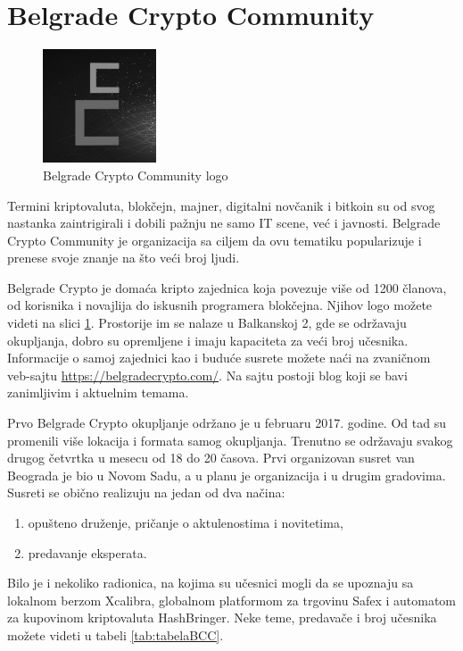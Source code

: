 \documentclass[a4paper]{article}
\begin{document}
{\section{Belgrade Crypto Community}
\label{sec:bgdcs}

\begin{figure}[H]
  \centering
  \includegraphics[width=0.3\textwidth]{bcc_logo.png}
  \caption{Belgrade Crypto Community logo}
  \label{fig:bgdcclogo}
\end{figure}

Termini  kriptovaluta, blokčejn, majner, digitalni novčanik i bitkoin su od svog nastanka zaintrigirali i dobili pažnju ne samo IT scene, već i javnosti. Belgrade Crypto Community je organizacija sa ciljem da ovu tematiku popularizuje i prenese svoje znanje na što veći broj ljudi.

Belgrade Crypto je domaća kripto zajednica koja povezuje više od 1200 članova, od korisnika i novajlija do iskusnih programera blokčejna. Njihov logo možete videti na slici \ref{fig:bgdcclogo}. Prostorije im se nalaze u Balkanskoj 2, gde se održavaju okupljanja, dobro su opremljene i imaju kapaciteta za veći broj učesnika. Informacije o samoj zajednici kao i buduće susrete možete naći na zvaničnom veb-sajtu \url{https://belgradecrypto.com/}. Na sajtu postoji blog koji se bavi zanimljivim i aktuelnim temama.\cite{aboutBCC}

Prvo Belgrade Crypto okupljanje održano je u februaru 2017. godine. Od tad su promenili više lokacija i formata samog okupljanja. Trenutno se održavaju svakog drugog četvrtka u mesecu od 18 do 20 časova. Prvi organizovan susret van Beograda je bio u Novom Sadu, a u planu je organizacija i u drugim gradovima. Susreti se obično realizuju na jedan od dva načina:
\begin{enumerate}
\item  opušteno druženje, pričanje o aktulenostima i novitetima,
\item predavanje eksperata.
\end{enumerate}
Bilo je i nekoliko radionica, na kojima su učesnici mogli  da se upoznaju sa lokalnom berzom Xcalibra, globalnom platformom za trgovinu Safex i automatom za kupovinom kriptovaluta HashBringer. Neke teme, predavače i broj učesnika možete videti u tabeli \ref{tab:tabelaBCC}.

}
\end{document}
